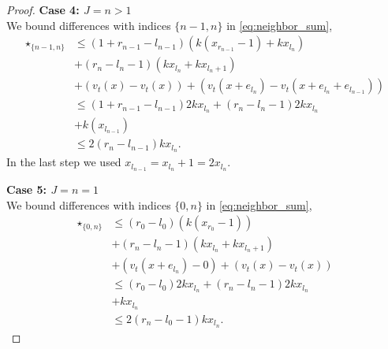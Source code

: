 \documentclass[12pt]{amsart}
\begin{document}
\begin{proof}
	{\bf Case 4: $J = n > 1$}  \\
	We bound differences with indices $\{n-1,n\}$ in \eqref{eq:neighbor_sum},
	\begin{align*}
	\star_{\{n-1,n\}} 
	&\leq (1 + r_{n-1} - l_{n-1})( k (x_{r_{n-1}}-  1) + k x_{l_n}) \\
	&+ (r_n  - l_n-1) ( k x_{l_n} + k x_{l_{n} + 1}) \\
	&+ (v_t(x) - v_t(x)) + (v_t(x + e_{l_n}) - v_t(x + e_{l_n}  + e_{l_{n-1}})) \\
	&\leq (1 + r_{n-1} - l_{n-1})2 k x_{l_n} + (r_n  - l_n-1) 2 k x_{l_n} \\
	&+ k (x_{l_{n-1}}) \\
	&\leq  2 (r_n - l_{n-1}) k x_{l_n}.
	\end{align*}
	In the last step we used $x_{l_{n-1}} = x_{l_n} + 1 = 2 x_{l_n}$. 
	
	
		
	{\bf Case 5: $J = n = 1$} \\
	We bound differences with indices $\{0,n\}$ in \eqref{eq:neighbor_sum},
	\begin{align*}
	\star_{\{0,n\}} 
	&\leq (r_0 - l_0) (k (x_{r_0} - 1))  \\
	&+ (r_n - l_n - 1) (k x_{l_n} + k x_{l_n+1}) \\
	&+ (v_t(x + e_{l_n}) - 0) + (v_t(x) - v_t(x)) \\
	&\leq (r_0 - l_0) 2 k x_{l_n} + (r_n - l_n - 1) 2 k x_{l_n}   \\
	&+ k x_{l_n} \\ 
	&\leq 2 (r_n - l_0 - 1) k x_{l_n}.
	\end{align*}

	
	

	
	
	
	
	

	
	\end{proof}
	
\end{document}
